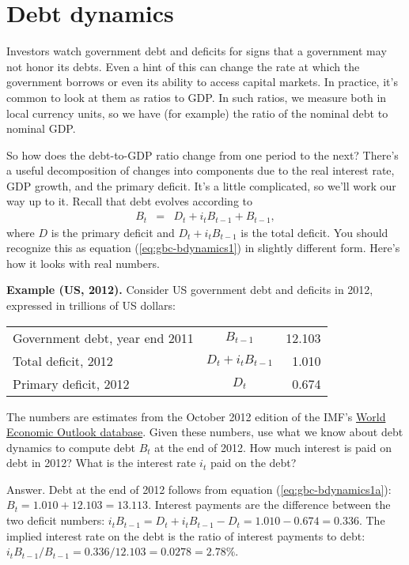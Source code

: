%
\section{Debt dynamics}

Investors watch government debt and deficits
for signs that a government may not honor its debts.
Even a hint of this can change the rate at which the government
borrows or even its ability to access capital markets.
In practice, it's common to look at them as ratios to GDP.
In such ratios, we measure both in local currency units,
so we have (for example) the ratio of the nominal debt to nominal GDP.

So how does the debt-to-GDP ratio change from one period to the next?
There's a useful decomposition of changes
into components due to the real interest rate, GDP growth, and the
primary deficit.
It's a little complicated, so we'll work our way up to it.
Recall that debt evolves according to
\begin{eqnarray}
    B_{t} &=& D_t + i_t B_{t-1} + B_{t-1}  ,
    \label{eq:gbc-bdynamics1a}
\end{eqnarray}
where $D$ is the primary deficit
and $D_t + i_t B_{t-1}$ is the total deficit.
You should recognize this as equation (\ref{eq:gbc-bdynamics1})
in slightly different form.
Here's how it looks with real numbers.

{\bf Example (US, 2012).}
Consider US government debt and deficits in 2012,
expressed in trillions of US dollars:

\begin{center}
\begin{tabular}{lcr}
\toprule
%
Government debt, year end 2011  &  $B_{t-1}$    & 12.103 \\
Total deficit, 2012             &  $ D_t + i_t B_{t-1}$ & 1.010 \\
Primary deficit, 2012           &  $D_t$        &  0.674 \\
\bottomrule
\end{tabular}
\end{center}

The numbers are estimates from the October 2012 edition of the IMF's
\href{http://www.imf.org/external/ns/cs.aspx?id=28}{World Economic Outlook database}.
%
Given these numbers, 
use what we know about debt dynamics to compute debt $B_t$ at the end of 2012.
How much interest is paid on debt in 2012?  
What is the interest rate $i_t$ paid on the debt?

Answer.
Debt at the end of 2012 follows from equation (\ref{eq:gbc-bdynamics1a}):
$B_t = 1.010 + 12.103 = 13.113$.
Interest payments are the difference between the two deficit numbers:
$ i_t B_{t-1} = D_t + i_t B_{t-1} - D_t = 1.010 - 0.674 = 0.336 $.
The implied interest rate on the debt is
the ratio of interest payments to debt:
$ i_t B_{t-1}/B_{t-1} = 0.336/12.103 = 0.0278 = 2.78\%$.


